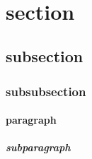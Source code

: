 \documentclass[11pt, a4paper, UTF8]{ctexart}
\begin{document}
\indent\\

\section{section}
\subsection{subsection}
\subsubsection{subsubsection}

\paragraph{paragraph}
\subparagraph{subparagraph}
\end{document}
